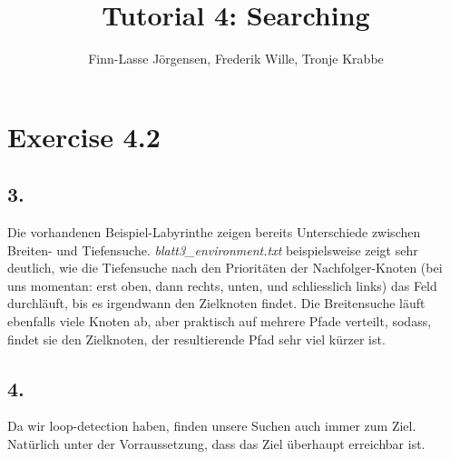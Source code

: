 \documentclass[12pt,a4paper]{article}
\author{Finn-Lasse Jörgensen, Frederik Wille, Tronje Krabbe}
\title{Tutorial 4: Searching}
\begin{document}
\maketitle


\section*{Exercise 4.2}
\subsection*{3.}
Die vorhandenen Beispiel-Labyrinthe zeigen bereits Unterschiede zwischen
Breiten- und Tiefensuche. \textit{blatt3\_environment.txt} beispielsweise
zeigt sehr deutlich, wie die Tiefensuche nach den Prioritäten der Nachfolger-Knoten
(bei uns momentan: erst oben, dann rechts, unten, und schliesslich links)
das Feld durchläuft, bis es irgendwann den Zielknoten findet.
Die Breitensuche läuft ebenfalls viele Knoten ab,
aber praktisch auf mehrere Pfade verteilt, sodass, findet sie den Zielknoten,
der resultierende Pfad sehr viel kürzer ist.

\subsection*{4.}
Da wir loop-detection haben, finden unsere Suchen auch immer zum Ziel.
Natürlich unter der Vorraussetzung, dass das Ziel überhaupt erreichbar ist.
\end{document}
